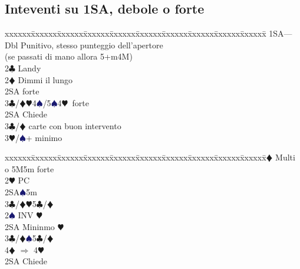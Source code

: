 \documentclass[a4paper,italian]{article}
\newcommand{\BC}{\textcolor{OliveGreen}{$\clubsuit$}}
\newcommand{\BD}{\textcolor{RedOrange}{$\vardiamondsuit$}}
\newcommand{\BH}{\textcolor{Red2}{$\varheartsuit${}}}
\newcommand{\BS}{\textcolor{MidnightBlue}{$\spadesuit${}}}
\newenvironment{bidtable}
{\begin{tabbing}

    xxxxxx\=xxxxxx\=xxxxxx\=xxxxxx\=xxxxxx\=xxxxxx\=xxxxxx\=xxxxxx\=xxxxxx\=xxxxxx\=\kill}
{\end{tabbing} }%
\begin{document}
\begin{multicols}{2}
                                        \subsection{Inteventi su 1SA, debole o forte}
                                        \begin{bidtable}
                                            1SA---\\
                                            Dbl \> Punitivo, stesso punteggio dell'apertore\+\\(se passati di mano allora 5+m4M)\-\\
                                            2\BC \> Landy\+\\
                                                2\BD\> Dimmi il lungo\+\\
                                                    2SA forte\\
                                                    3\BC/\BD{}\BH4\BS/5\BS4\BH\ forte\-\\
                                                2SA \> Chiede\+\\
                                                    3\BC/\BD{} carte con buon intervento\\
                                                    3\BH/\BS{}+ minimo\-\-\\
                                        \end{bidtable}
                                        \begin{bidtable}
                                            2\BD\> Multi o 5M5m forte\+\\
                                                2\BH\> PC\+\\
                                                    2SA\BS5m\\
                                                    3\BC/\BD{}\BH5\BC/\BD\-\\
                                                2\BS\> INV \BH\+\\
                                                    2SA\> Mininmo \BH\\
                                                    3\BC/\BD{}\BS5\BC/\BD\\
                                                    4\BD\> $\Rightarrow$ 4\BH\-\\
                                                2SA\> Chiede\+\\

\end{bidtable}
\end{multicols}
\end{document}

